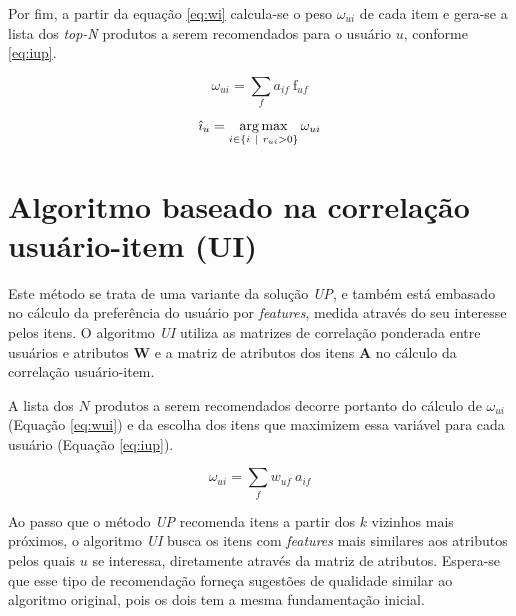 Por fim, a partir da equação \ref{eq:wi} calcula-se o peso $\omega_{ui}$ de cada item e gera-se a lista dos \textit{top-N} produtos a serem recomendados para o usuário $u$, conforme \ref{eq:iup}. 

\begin{equation}
\label{eq:wi} 
    \omega_{ui} = \sum_{f}{a_{if}~\mathrm{f}_{uf}}
\end{equation} 

\begin{equation}
\label{eq:iup} 
    \hat{\imath}_u = \operatorname*{arg\,max}_{i \in \left\{i~|~r_{ui} > 0\right\}}{\omega_{ui}}
\end{equation} 

\section{Algoritmo baseado na correlação usuário-item (UI)} %
\label{sec:algoritmo_baseado_na_correla_o_usu_rio_item_ui_}

Este método se trata de uma variante da solução \textit{UP}, e também está embasado no cálculo da preferência do usuário por \textit{features}, medida através do seu interesse pelos itens. O algoritmo \textit{UI} utiliza as matrizes de correlação ponderada entre usuários e atributos $\mathbf{W}$ e a matriz de atributos dos itens $\mathbf{A}$ no cálculo da correlação usuário-item.

A lista dos $N$ produtos a serem recomendados decorre portanto do cálculo de $\omega_{ui}$ (Equação \ref{eq:wui}) e da escolha dos itens que maximizem essa variável para cada usuário (Equação \ref{eq:iup}).

\begin{equation}
\label{eq:wui} 
    \omega_{ui} = \sum_{f}{w_{uf}~a_{if}}
\end{equation} 

Ao passo que o método \textit{UP} recomenda itens a partir dos $k$ vizinhos mais próximos, o algoritmo \textit{UI} busca os itens com \textit{features} mais similares aos atributos pelos quais $u$ se interessa, diretamente através da matriz de atributos. Espera-se que esse tipo de recomendação forneça sugestões de qualidade similar ao algoritmo original, pois os dois tem a mesma fundamentação inicial. 


